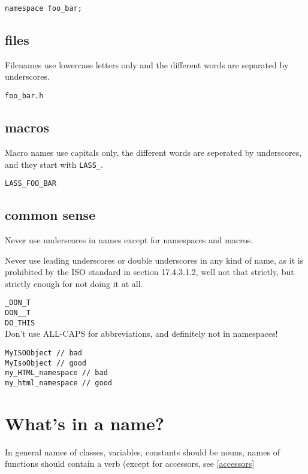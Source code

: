 \documentclass[10pt,a4paper,titlepage,dutch]{report}
\begin{document}
\verb|namespace foo_bar;|\\

\subsection{files}

Filenames use lowercase letters only and the different words are
separated by underscores.

\verb|foo_bar.h|\\

\subsection{macros}

Macro names use capitals only, the different words are seperated
by underscores, and they start with \verb|LASS_|.

\verb|LASS_FOO_BAR|\\

\subsection{common sense}

Never use underscores in names except for namespaces and macros.

Never use leading underscores or double underscores in any kind of
name, as it is prohibited by the ISO standard \cite{Cpp98}  in
section 17.4.3.1.2, well not that strictly, but strictly enough
for not doing it at all.

\verb|_DON_T|\\
\verb|DON__T|\\
\verb|DO_THIS|\\

Don't use ALL-CAPS for abbreviations, and definitely not in
namespaces!

\verb|MyISOObject // bad|\\
\verb|MyIsoObject // good|\\
\verb|my_HTML_namespace // bad|\\
\verb|my_html_namespace // good|\\

\section{What's in a name?}

In general names of classes, variables, constants should be nouns,
names of functions should contain a verb (except for accessors,
see \ref{accessors}
\end{document}
